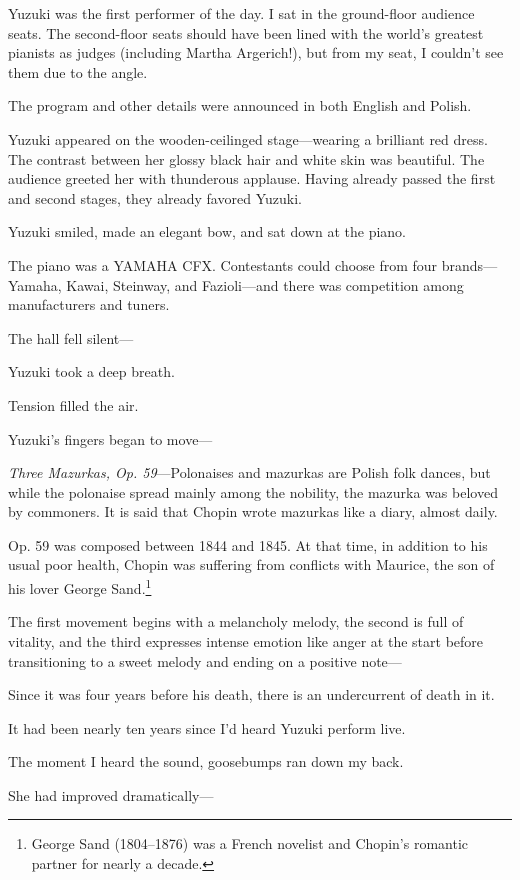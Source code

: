 \documentclass[
    a4paper,
    12pt,
    twoside,
    openany,
    UTF8,
    fontset=windows
]{ctexbook}
\begin{document}
Yuzuki was the first performer of the day. I sat in the ground-floor audience seats. The second-floor seats should have been lined with the world's greatest pianists as judges (including Martha Argerich!), but from my seat, I couldn't see them due to the angle.

The program and other details were announced in both English and Polish.

Yuzuki appeared on the wooden-ceilinged stage---wearing a brilliant red dress. The contrast between her glossy black hair and white skin was beautiful. The audience greeted her with thunderous applause. Having already passed the first and second stages, they already favored Yuzuki.

Yuzuki smiled, made an elegant bow, and sat down at the piano.

The piano was a YAMAHA CFX. Contestants could choose from four brands---Yamaha, Kawai, Steinway, and Fazioli---and there was competition among manufacturers and tuners.

The hall fell silent---

Yuzuki took a deep breath.

Tension filled the air.

Yuzuki's fingers began to move---

\emph{Three Mazurkas, Op. 59}---Polonaises and mazurkas are Polish folk dances, but while the polonaise spread mainly among the nobility, the mazurka was beloved by commoners. It is said that Chopin wrote mazurkas like a diary, almost daily.

Op. 59 was composed between 1844 and 1845. At that time, in addition to his usual poor health, Chopin was suffering from conflicts with Maurice, the son of his lover George Sand.\footnote{George Sand (1804–1876) was a French novelist and Chopin's romantic partner for nearly a decade.}

The first movement begins with a melancholy melody, the second is full of vitality, and the third expresses intense emotion like anger at the start before transitioning to a sweet melody and ending on a positive note---

Since it was four years before his death, there is an undercurrent of death in it.

It had been nearly ten years since I'd heard Yuzuki perform live.

The moment I heard the sound, goosebumps ran down my back.

She had improved dramatically---
\end{document}

